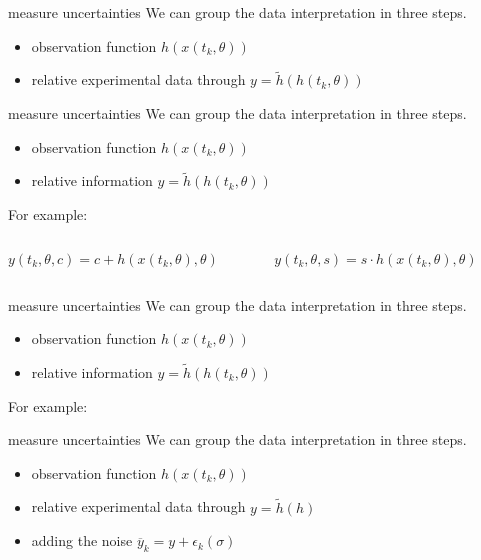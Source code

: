 \documentclass{beamer}
\begin{document}
  	\begin{frame}{measure uncertainties}
    	We can group the data interpretation in three steps.
    	\begin{itemize}
    		\item observation function $h(x(t_k,\theta))$
    		\item relative experimental data through $y = \tilde{h}
    		(h(t_k, \theta))$
    	\end{itemize}
  	\end{frame}
  	
  	\begin{frame}{measure uncertainties}
    	We can group the data interpretation in three steps.
    	\begin{itemize}
    		\item observation function $h(x(t_k,\theta))$
    		\item relative information $y = \tilde{h}
    		(h(t_k, \theta))$
    	\end{itemize}
    	For example:
    	\vspace{0.7cm}
    	\begin{columns}
  			\begin{column}{5cm}
  				$y(t_k,\theta,c) = c + h(x(t_k,\theta),\theta)$
  			\end{column}
  			\begin{column}{5cm}
 				$y(t_k,\theta,s) = s \cdot h(x(t_k,\theta),\theta)$
  			\end{column}
  		\end{columns}
  	\end{frame}
  	
  	\begin{frame}{measure uncertainties}
    	We can group the data interpretation in three steps.
    	\begin{itemize}
    		\item observation function $h(x(t_k,\theta))$
    		\item relative information $y = \tilde{h}
    		(h(t_k, \theta))$
    	\end{itemize}
    	For example:
    	\vspace{0.7cm}
  	\end{frame}  	
  	
  	\begin{frame}{measure uncertainties}
    	We can group the data interpretation in three steps.
    	\begin{itemize}
    		\item observation function $h(x(t_k,\theta))$
    		\item relative experimental data through $y = \tilde{h}(h)$
    		\item adding the noise $\overline{y}_{k} = y + \epsilon_{k}(\sigma)$
    	\end{itemize}
  	\end{frame}
  	
\end{document}
